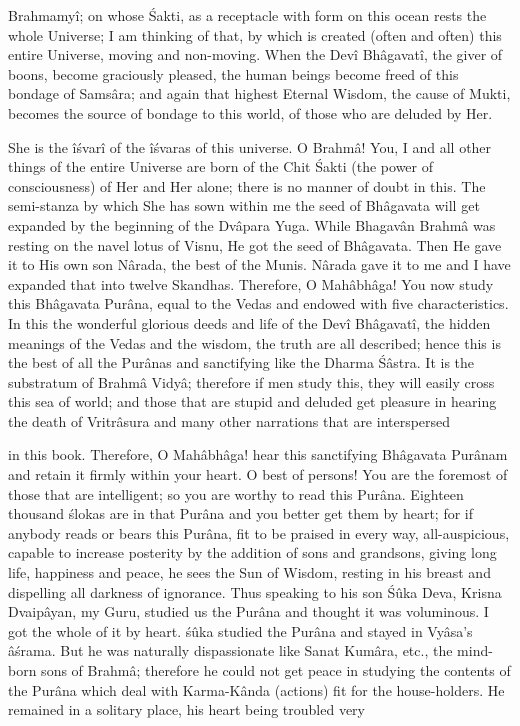 Brahmamy\^i; on whose \'Sakti, as a receptacle with form on this ocean rests the whole Universe; I am thinking of that, by which is created (often and often) this entire Universe, moving and non-moving. When the Dev\^i Bh\^agavat\^i, the giver of boons, become graciously pleased, the human beings become freed of this bondage of Sams\^ara; and again that highest Eternal Wisdom, the cause of Mukti, becomes the source of bondage to this world, of those who are deluded by Her.

She is the \^i\'svar\^i of the \^i\'svaras of this universe. O Brahm\^a! You, I and all other things of the entire Universe are born of the Chit \'Sakti (the power of consciousness) of Her and Her alone; there is no manner of doubt in this. The semi-stanza by which She has sown within me the seed of Bh\^agavata will get expanded by the beginning of the Dv\^apara Yuga. While Bhagav\^an Brahm\^a was resting on the navel lotus of Visnu, He got the seed of Bh\^agavata. Then He gave it to His own son N\^arada, the best of the Munis. N\^arada gave it to me and I have expanded that into twelve Skandhas. Therefore, O Mah\^abh\^aga! You now study this Bh\^agavata Pur\^ana, equal to the Vedas and endowed with five characteristics. In this the wonderful glorious deeds and life of the Dev\^i Bh\^agavat\^i, the hidden meanings of the Vedas and the wisdom, the truth are all described; hence this is the best of all the Pur\^anas and sanctifying like the Dharma \'S\^astra. It is the substratum of Brahm\^a Vidy\^a; therefore if men study this, they will easily cross this sea of world; and those that are stupid and deluded get pleasure in hearing the death of Vritr\^asura and many other narrations that are interspersed

in this book. Therefore, O Mah\^abh\^aga! hear this sanctifying Bh\^agavata Pur\^anam and retain it firmly within your heart. O best of persons! You are the foremost of those that are intelligent; so you are worthy to read this Pur\^ana. Eighteen thousand \'slokas are in that Pur\^ana and you better get them by heart; for if anybody reads or bears this Pur\^ana, fit to be praised in every way, all-auspicious, capable to increase posterity by the addition of sons and grandsons, giving long life, happiness and peace, he sees the Sun of Wisdom, resting in his breast and dispelling all darkness of ignorance. Thus speaking to his son \'S\^uka Deva, Krisna Dvaip\^ayan, my Guru, studied us the Pur\^ana and thought it was voluminous. I got the whole of it by heart. \'s\^uka studied the Pur\^ana and stayed in Vy\^asa's \^a\'srama. But he was naturally dispassionate like Sanat Kum\^ara, etc., the mind-born sons of Brahm\^a; therefore he could not get peace in studying the contents of the Pur\^ana which deal with Karma-K\^anda (actions) fit for the house-holders. He remained in a solitary place, his heart being troubled very

